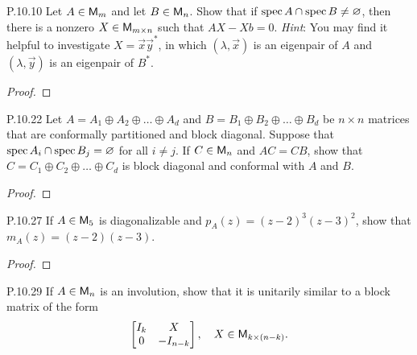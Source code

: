 \documentclass{../homework}
\date{Tuesday 4/9}
\author{}
\begin{document}
\begin{problems}
\item[P.10.10] Let \(A \in \mathsf{M}_m\) and let \(B \in \mathsf{M}_n\).  Show that
  if \(\operatorname{spec} A \cap \operatorname{spec} B \ne \varnothing\), then there is a nonzero
  \(X \in \mathsf{M}_{m \times n}\) such that \(AX - Xb = 0\).  \textit{Hint}:
  You may find it helpful to investigate \(X = \vec x \vec y^*\), in
  which \((\lambda, \vec x)\) is an eigenpair of \(A\) and
  \((\lambda, \vec y)\) is an eigenpair of \(B^*\).

  \begin{solution}
    \begin{proof}

    \end{proof}
  \end{solution}

\item[P.10.22] Let \(A = A_1 \oplus A_2 \oplus \dots \oplus A_d\) and
  \(B = B_1 \oplus B_2 \oplus \dots \oplus B_d\) be \(n \times n\)
  matrices that are conformally partitioned and block diagonal.
  Suppose that \(\operatorname{spec} A_i \cap \operatorname{spec} B_j = \varnothing\) for all
  \(i \ne j\).  If \(C \in \mathsf{M}_n\) and \(AC = CB\), show that
  \(C = C_1 \oplus C_2 \oplus \dots \oplus C_d\) is block diagonal and
  conformal with \(A\) and \(B\).

  \begin{solution}
    \begin{proof}

    \end{proof}
  \end{solution}

\item[P.10.27] If \(A \in \mathsf{M}_5\) is diagonalizable and
  \(p_A(z) = (z-2)^3 (z-3)^2\), show that \(m_A(z) = (z-2)(z-3)\).

  \begin{solution}
    \begin{proof}

    \end{proof}
  \end{solution}

\item[P.10.29] If \(A \in \mathsf{M}_n\) is an involution, show that it is
  unitarily similar to a block matrix of the form
  \[
    \begin{bmatrix}
      I_k & X \\ 0 & -I_{n-k}
    \end{bmatrix},
    \quad X \in \mathsf{M}_{k \times (n-k)}.
  \]


\end{problems}
\end{document}
